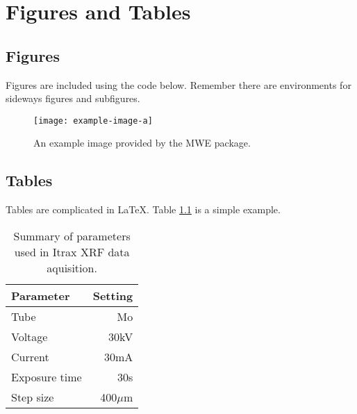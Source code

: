 \chapter{Figures and Tables}
\section{Figures}
Figures are included using the code below. Remember there are environments for sideways figures and subfigures. 

\begin{figure}[tbp]
	\centering
		\texttt{[image: example-image-a]}
	\caption[An example image.]{An example image provided by the MWE package.}
	\label{fig:editapic}
\end{figure}

\section{Tables}
Tables are complicated in \LaTeX. Table \ref{tab:itraxsetupsummary} is a simple example.

\begin{table}[tbp]
	\centering
		\begin{tabular}{lr}
		 \hline
		 Parameter     & Setting       \\ \hline
		 Tube          & Mo            \\
		 Voltage       & 30kV          \\
		 Current       & 30mA          \\
	   Exposure time & 30s           \\
		 Step size     & 400$\mu$m     \\
		 \hline			
		\end{tabular}
	\caption[Summary of parameters used in Itrax XRF data aquisition.]{Summary of parameters used in Itrax XRF data aquisition.}
	\label{tab:itraxsetupsummary}
\end{table}